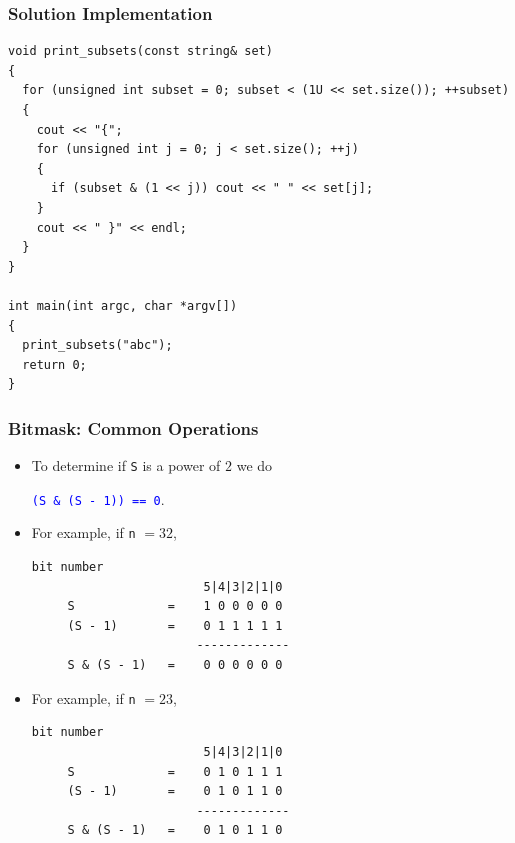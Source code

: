 \documentclass{beamer}
\begin{document}
\ifanswers

\begin{frame}[containsverbatim]
\frametitle{Solution Implementation}

\scriptsize

\begin{lstlisting}[mathescape]
void print_subsets(const string& set)
{
  for (unsigned int subset = 0; subset < (1U << set.size()); ++subset)
  {
    cout << "{";
    for (unsigned int j = 0; j < set.size(); ++j)
    {
      if (subset & (1 << j)) cout << " " << set[j];
    }
    cout << " }" << endl;
  }
}

int main(int argc, char *argv[])
{
  print_subsets("abc");
  return 0;
}
\end{lstlisting}

\end{frame}

\fi

\begin{frame}[fragile]
\frametitle{Bitmask: Common Operations}
\label{slide:bitmask_power_of_two}
\scriptsize

\begin{itemize}

\item To determine if \verb+S+ is a power of $2$ we do
\begin{center}
\textcolor{blue}{\texttt{(S \& (S - 1)) == 0}}.
\end{center}

\vspace{0.1cm}

\item<2-> For example, if \verb+n+ $= 32$,

\begin{center}
\begin{Verbatim}[commandchars=@\[\]]
                         bit number
                        5|4|3|2|1|0
     S             =    1 0 0 0 0 0
     (S - 1)       =    0 1 1 1 1 1
                       -------------
     S & (S - 1)   =    0 0 0 0 0 0
\end{Verbatim}
\end{center}

\vspace{0.1cm}

\item<3-> For example, if \verb+n+ $= 23$,

\begin{center}
\begin{Verbatim}[commandchars=@\[\]]
                         bit number
                        5|4|3|2|1|0
     S             =    0 1 0 1 1 1
     (S - 1)       =    0 1 0 1 1 0
                       -------------
     S & (S - 1)   =    0 1 0 1 1 0
\end{Verbatim}
\end{center}

\end{itemize}

\end{frame}
\end{document}
